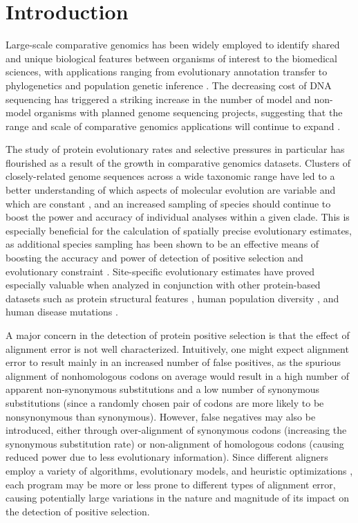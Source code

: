 \documentclass{mbe}
\begin{document}

\mbestyle

\section*{Introduction}

Large-scale comparative genomics has been widely employed to identify
shared and unique biological features between organisms of interest to
the biomedical sciences, with applications ranging from evolutionary
annotation transfer \citep{Bork1998Predicting} to phylogenetics
\citep{Murphy2007Using,Prasad2008Confirming} and population genetic
inference \citep{Hurst2009Genetics}. The decreasing cost of DNA
sequencing has triggered a striking increase in the number of model
and non-model organisms with planned genome sequencing projects,
suggesting that the range and scale of comparative genomics
applications will continue to expand
\citep{Green20072x,2007Identification}.

The study of protein evolutionary rates and selective pressures in
particular has flourished as a result of the growth in comparative
genomics datasets. Clusters of closely-related genome sequences across
a wide taxonomic range have led to a better understanding of which
aspects of molecular evolution are variable and which are constant
\citep{Wolf2009Nonlinear}, and an increased sampling of species should
continue to boost the power and accuracy of individual analyses within
a given clade. This is especially beneficial for the calculation of
spatially precise evolutionary estimates, as additional species
sampling has been shown to be an effective means of boosting the
accuracy and power of \sw detection of positive selection and
evolutionary constraint
\citep{Anisimova2001Accuracy,Massingham2005Detecting}. Site-specific
evolutionary estimates have proved especially valuable when analyzed
in conjunction with other protein-based datasets such as protein
structural features \citep{Lin2007Proportion,Ramsey2011Relationship},
human population diversity \citep{2010Map}, and human disease
mutations \citep{Arbiza2006Selective}.

A major concern in the \sw detection of protein positive
selection is that the effect of alignment error is not well
characterized. Intuitively, one might expect alignment error to result
mainly in an increased number of false positives, as the spurious
alignment of nonhomologous codons on average would result in a high
number of apparent non-synonymous substitutions and a low number of
synonymous substitutions (since a randomly chosen pair of codons are
more likely to be nonsynonymous than synonymous). However, false
negatives may also be introduced, either through over-alignment of
synonymous codons (increasing the synonymous substitution rate) or
non-alignment of homologous codons (causing reduced power due to less
evolutionary information). Since different aligners employ a variety
of algorithms, evolutionary models, and heuristic optimizations
\citep{Notredame2007Recent}, each program may be more or less prone to different
types of alignment error, causing potentially large variations in the
nature and magnitude of its impact on the detection of positive
selection.
\end{document}
